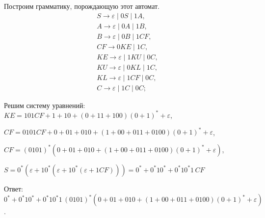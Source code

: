 \documentclass[fleqn,12pt, a4paper]{article}
\newcommand {\eps} {\varepsilon}
\begin{document}
\begin{enumerate}[label=(\roman{*})]
	Построим грамматику, порождающую этот автомат.
	\begin{equation}
		\begin{array}{l}
		S \to \eps \mid 0S \mid 1A, \\
		A \to \eps \mid 0A \mid 1B, \\
		B \to \eps \mid 0B \mid 1CF, \\
		CF \to 0KE \mid 1C, \\
		KE \to \eps \mid 1KU \mid 0C, \\
		KU \to \eps \mid 0KL \mid 1C, \\
		KL \to \eps \mid 1CF \mid 0C, \\
		C \to \eps \mid 1C \mid 0C; 
		\end{array}
	\end{equation}
	
	Решим систему уравнений:\\
	
	$KE = 101CF + 1 + 10 + (0 + 11 + 100)(0+1)^* + \eps$,
	
	$CF = 0101CF + 0 + 01 + 010 + (1 + 00 + 011 + 0100)(0+1)^* + \eps$,
	
	$CF = (0101)^*(0 + 01 + 010 + (1 + 00 + 011 + 0100)(0+1)^* + \eps)$,
	
	$S = 0^*(\eps + 10^*(\eps + 10^*(\eps + 1CF))) = 0^* + 0^*10^* + 0^*10^*1\,CF$
	
	Ответ: $0^* + 0^*10^* + 0^*10^*1\,(0101)^*(0 + 01 + 010 + (1 + 00 + 011 + 0100)(0+1)^* + \eps)$.
	
\end{enumerate}
\end{document}
